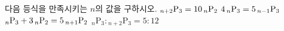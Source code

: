 다음 등식을 만족시키는 $n$의 값을 구하시오.
 ${}_{n+2}\mathrm{P}_3=10\mkern3mu {}_n\mathrm{P}_2$
 $4\mkern3mu {}_n\mathrm{P}_3=5\mkern3mu {}_{n-1}\mathrm{P}_3$
 ${}_n\mathrm{P}_3+3\mkern3mu {}_n\mathrm{P}_2=5\mkern3mu {}_{n+1}\mathrm{P}_2$
 ${}_n\mathrm{P}_3 : {}_{n+2}\mathrm{P}_3=5 : 12$
